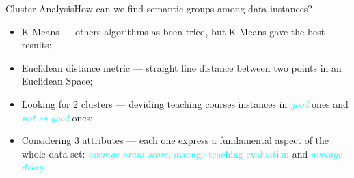 \begin{frame}{Cluster Analysis}{How can we find semantic groups among data instances?}

\vspace{0.1cm}
 \vspace{0,3cm}
\vspace{-0.2cm}
	\begin{block}{}
		\begin{itemize}
			\item<1-> \alert{K-Means} --- others algorithms as been tried, but K-Means gave the best results; \vspace{0.2cm}
            \item<2-> \alert{Euclidean distance metric} --- straight line distance between two points in an Euclidean Space; \vspace{0.2cm}
			\item<3-> \alert{Looking for 2 clusters} --- deviding teaching courses instances in \textcolor{cyan}{\emph{good}} ones and \textcolor{cyan}{\emph{not-so-good}} ones; \vspace{0.2cm}
			\item<4-> \alert{Considering 3 attributes} --- each one express a fundamental aspect of the whole data set: \textcolor{cyan}{\emph{average exam score}, \textcolor{cyan}{average teaching evaluation}} and \textcolor{cyan}{\emph{average delay}}.
		\end{itemize}
	\end{block}

\end{frame}

